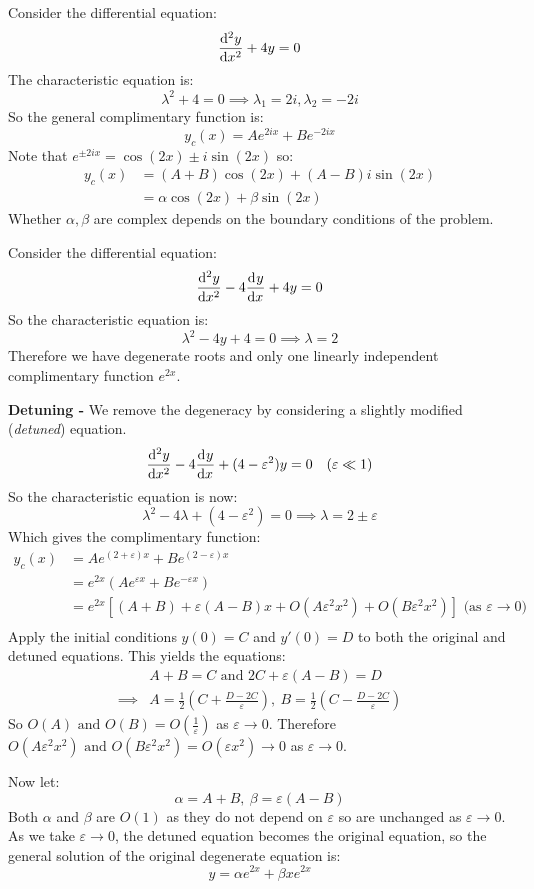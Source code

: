 \documentclass[../main.tex]{subfiles}
\begin{document}
\begin{example}
  Consider the differential equation: \label{complexNonDegenerate}
  \[
    \deriv[2]{y}{x} + 4y = 0
  \]
  The characteristic equation is:
  \[
    \lambda^2 + 4 = 0 \implies \lambda_1 = 2i, \lambda_2 = -2i
  \]
  So the general complimentary function is:
  \[
    y_c(x) = Ae^{2ix} + Be^{-2ix}
  \]
  Note that $e^{\pm2ix} = \cos(2x) \pm i \sin(2x)$ so:
  \begin{align*}
    y_c(x) &= (A + B)\cos(2x) + (A - B)i\sin(2x) \\
           &= \alpha \cos(2x) + \beta \sin(2x)
  \end{align*}
  Whether $\alpha, \beta$ are complex depends on the boundary conditions of the problem.
\end{example}
\begin{example}
  Consider the differential equation: \label{detuningExample}
  \[
    \deriv[2]{y}{x} - 4\deriv{y}{x} + 4y = 0
  \]
  So the characteristic equation is:
  \[
    \lambda^2 - 4y + 4 = 0 \implies \lambda = 2
  \]
  Therefore we have degenerate roots and only one linearly independent complimentary function $e^{2x}$.

  \textbf{Detuning -} We remove the degeneracy by considering a slightly modified (\textit{detuned}) equation.
  \[
    \deriv[2]{y}{x} - 4 \deriv{y}{x} + (4 - \varepsilon^2)y = 0 \quad (\varepsilon \ll 1)
  \]
  So the characteristic equation is now:
  \[
    \lambda^2 - 4\lambda + (4 - \varepsilon^2) = 0 \implies \lambda = 2 \pm \varepsilon
  \]
  Which gives the complimentary function:
  \begin{align*}
    y_c(x) &= Ae^{(2 + \varepsilon)x} + Be^{(2 - \varepsilon)x} \\
           &=e^{2x}(Ae^{\varepsilon x} + Be^{-\varepsilon x}) \\
           &=e^{2x}[(A+B) + \varepsilon(A - B)x + O(A\varepsilon^2x^2) + O(B\varepsilon^2x^2)] \text{ (as $\varepsilon \to 0$)} \\
  \end{align*}
  Apply the initial conditions $y(0) = C$ and $y'(0) = D$ to both the original and detuned equations.
  This yields the equations:
  \begin{align*}
    &A + B = C \text{ and } 2C + \varepsilon(A - B) = D \\
    \implies& A = \frac{1}{2}\left(C + \frac{D - 2C}{\varepsilon}\right),\ B = \frac{1}{2}\left(C - \frac{D - 2C}{\varepsilon}\right)
  \end{align*}
  So $O(A) \text{ and } O(B) = O(\frac{1}{\varepsilon})$ as $\varepsilon \to 0$.
  Therefore $O(A\varepsilon^2x^2) \text{ and } O(B\varepsilon^2x^2) = O(\varepsilon x^2) \to 0$ as $\varepsilon \to0$.

  Now let:
  \[
    \alpha = A + B,\ \beta = \varepsilon(A - B)
  \]
  Both $\alpha$ and $\beta$ are $O(1)$ as they do not depend on $\varepsilon$ so are unchanged as $\varepsilon \to 0$.
  As we take $\varepsilon \to 0$, the detuned equation becomes the original equation, so the general solution of the original degenerate equation is:
  \[
    y = \alpha e^{2x} + \beta x e^{2x}
  \]
\end{example}
\end{document}

